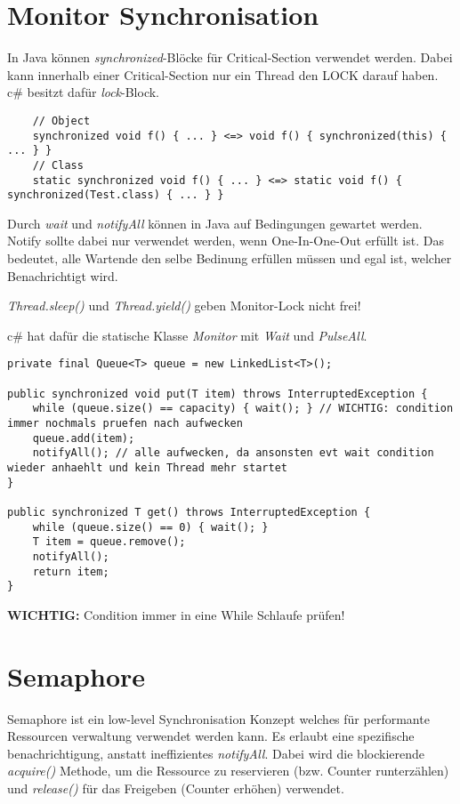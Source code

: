 \section{Monitor Synchronisation}
In Java können \textit{synchronized}-Blöcke für Critical-Section verwendet werden. Dabei kann innerhalb einer Critical-Section nur ein Thread den LOCK darauf haben. c\# besitzt dafür \textit{lock}-Block.
\begin{lstlisting}
	// Object
	synchronized void f() { ... } <=> void f() { synchronized(this) { ... } }
	// Class
	static synchronized void f() { ... } <=> static void f() { synchronized(Test.class) { ... } }
\end{lstlisting}
Durch \textit{wait} und \textit{notifyAll} können in Java auf Bedingungen gewartet werden. Notify sollte dabei nur verwendet werden, wenn One-In-One-Out erfüllt ist. Das bedeutet, alle Wartende den selbe Bedinung erfüllen müssen und egal ist, welcher Benachrichtigt wird.

\textit{Thread.sleep()} und \textit{Thread.yield()} geben Monitor-Lock nicht frei!

c\# hat dafür die statische Klasse \textit{Monitor} mit \textit{Wait} und \textit{PulseAll}.
\begin{lstlisting}
private final Queue<T> queue = new LinkedList<T>();

public synchronized void put(T item) throws InterruptedException {
	while (queue.size() == capacity) { wait(); } // WICHTIG: condition immer nochmals pruefen nach aufwecken
	queue.add(item);
	notifyAll(); // alle aufwecken, da ansonsten evt wait condition wieder anhaehlt und kein Thread mehr startet
}

public synchronized T get() throws InterruptedException {
	while (queue.size() == 0) { wait(); }
	T item = queue.remove();
	notifyAll();
	return item;
}
\end{lstlisting}
\textbf{WICHTIG:} Condition immer in eine While Schlaufe prüfen!


\section{Semaphore}
Semaphore ist ein low-level Synchronisation Konzept welches für performante Ressourcen verwaltung verwendet werden kann. Es erlaubt eine spezifische benachrichtigung, anstatt ineffizientes \textit{notifyAll}. Dabei wird die blockierende \textit{acquire()} Methode, um die Ressource zu reservieren (bzw. Counter runterzählen) und \textit{release()} für das Freigeben (Counter erhöhen) verwendet.

